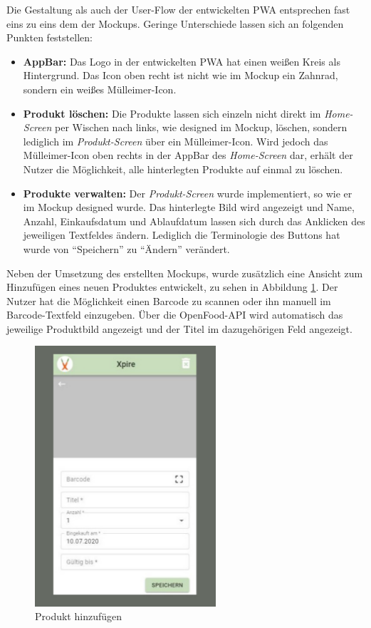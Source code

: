 Die Gestaltung als auch der User-Flow der entwickelten PWA entsprechen fast eins zu eins dem der Mockups. Geringe Unterschiede lassen sich an folgenden Punkten feststellen:
 \begin{itemize}[noitemsep]
 	\item \textbf{AppBar:} Das Logo in der entwickelten PWA hat einen weißen Kreis als Hintergrund. Das Icon oben recht ist nicht wie im Mockup ein Zahnrad, sondern ein weißes Mülleimer-Icon.
 	\item \textbf{Produkt löschen:} Die Produkte lassen sich einzeln nicht direkt im \textit{Home-Screen} per Wischen nach links, wie designed im Mockup, löschen, sondern lediglich im \textit{Produkt-Screen} über ein Mülleimer-Icon. Wird jedoch das Mülleimer-Icon oben rechts in der AppBar des \textit{Home-Screen} dar, erhält der Nutzer die Möglichkeit, alle hinterlegten Produkte auf einmal zu löschen.
 	\item \textbf{Produkte verwalten:} Der \textit{Produkt-Screen} wurde implementiert, so wie er im Mockup designed wurde. Das hinterlegte Bild wird angezeigt und Name, Anzahl, Einkaufsdatum und Ablaufdatum lassen sich durch das Anklicken des jeweiligen Textfeldes ändern. Lediglich die Terminologie des Buttons hat wurde von \enquote{Speichern} zu \enquote{Ändern} verändert.
 \end{itemize}

Neben der Umsetzung des erstellten Mockups, wurde zusätzlich eine Ansicht zum Hinzufügen eines neuen Produktes entwickelt, zu sehen in Abbildung \ref{fig:add}. Der Nutzer hat die Möglichkeit einen Barcode zu scannen oder ihn manuell im Barcode-Textfeld einzugeben. Über die OpenFood-API wird automatisch das jeweilige Produktbild angezeigt und der Titel im dazugehörigen Feld angezeigt.

\begin{figure}[h!]
	\centering
	\includegraphics[width=0.6\textwidth]{img/add.pdf}
	\caption{Produkt hinzufügen}
	\label{fig:add}
\end{figure}

